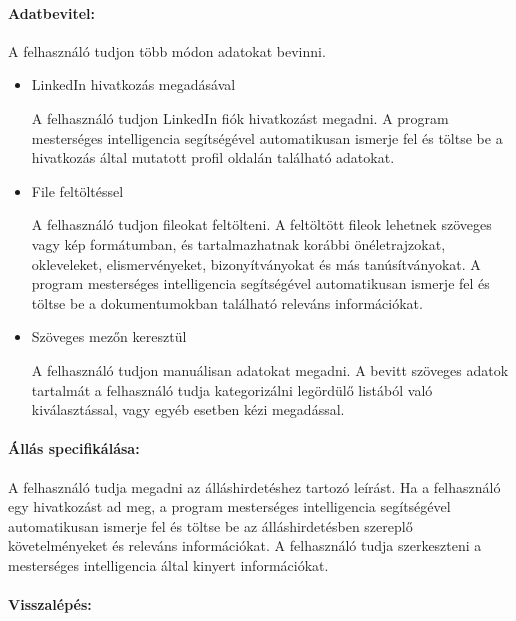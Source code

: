 \pagebreak

\paragraph{Adatbevitel:}

A felhasználó tudjon több módon adatokat bevinni.

\begin{itemize}
    
    \item LinkedIn hivatkozás megadásával

A felhasználó tudjon LinkedIn fiók hivatkozást megadni. A program mesterséges intelligencia segítségével automatikusan ismerje fel és töltse be a hivatkozás által mutatott profil oldalán található adatokat.

    \item File feltöltéssel
    
A felhasználó tudjon fileokat feltölteni. A feltöltött fileok lehetnek szöveges vagy kép formátumban, és tartalmazhatnak korábbi önéletrajzokat, okleveleket, elismervényeket, bizonyítványokat és más tanúsítványokat. A program mesterséges intelligencia segítségével automatikusan ismerje fel és töltse be a dokumentumokban található releváns információkat. 
    
    \item Szöveges mezőn keresztül

A felhasználó tudjon manuálisan adatokat megadni. A bevitt szöveges adatok tartalmát a felhasználó tudja kategorizálni legördülő listából való kiválasztással, vagy egyéb esetben kézi megadással. 

\end{itemize} 

\paragraph{Állás specifikálása:}

A felhasználó tudja megadni az álláshirdetéshez tartozó leírást. Ha a felhasználó egy hivatkozást ad meg, a program mesterséges intelligencia segítségével automatikusan ismerje fel és töltse be az álláshirdetésben szereplő követelményeket és releváns információkat. A felhasználó tudja szerkeszteni a mesterséges intelligencia által kinyert információkat.

\paragraph{Visszalépés:}

